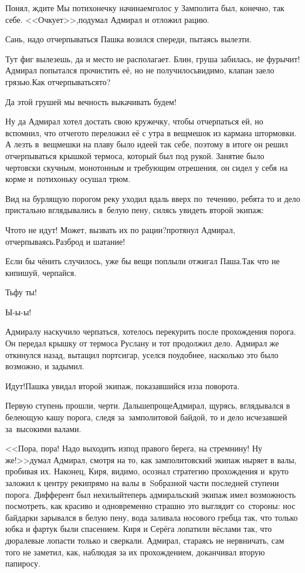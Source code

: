 \diagdash Понял, ждите\myldots{} Мы потихонечку начинаем\myldots{}\mdash голос у Замполита был, конечно, так себе. <<Очкует>>,\mdash подумал Адмирал и отложил рацию.

\diagdash Сань, надо отчерпываться\myldots{} \mdash Пашка возился спереди, пытаясь вылезти.

\diagdash Тут фиг вылезешь, да и место не располагает. Блин, груша забилась, не фурычит!\mdash Адмирал попытался прочистить её, но не получилось\mdash видимо, клапан заело грязью.\mdash Как отчерпываться\sdash то?

\diagdash Да этой грушей мы вечность выкачивать будем!

\diagdash Ну да\myldots{} \mdash Адмирал хотел достать свою кружечку, чтобы отчерпаться ей, но вспомнил, что отчего\sdash то переложил её с утра в вещмешок из кармана штормовки. А лезть в~вещмешки на плаву было идеей так себе, поэтому в итоге он решил отчерпываться крышкой термоса, который был под рукой. Занятие было чертовски скучным, монотонным и требующим отрешения, он сидел у себя на корме и~потихоньку осушал трюм.

Вид на бурлящую порогом реку уходил вдаль вверх по~течению, ребята то и дело пристально вглядывались в~белую пену, силясь увидеть второй экипаж:

\diagdash Что\sdash то не идут! Может, вызвать их по рации?\mdash протянул Адмирал, отчерпываясь.\mdash Разброд и шатание!

\diagdash Если бы чё\sdash нить случилось, уже бы вещи поплыли\myldots{} \mdash отжигал Паша.\mdash Так что не кипишуй, черпайся.

\diagdash Тьфу ты!

\diagdash Ы-ы-ы!

Адмиралу наскучило черпаться, хотелось перекурить после прохождения порога. Он передал крышку от термоса Руслану и тот продолжил дело. Адмирал же откинулся назад, вытащил портсигар, уселся поудобнее, насколько это было возможно, и задымил.

\diagdash Идут!\mdash Пашка увидал второй экипаж, показавшийся из\sdash за поворота. 

\diagdash Первую ступень прошли, черти. Дальше\mdash проще\myldots{}\mdash Адмирал, щурясь, вглядывался в белеющую кашу порога, следя за~замполитовой байдой, то и дело исчезавшей за~высокими валами.%

<<Пора, пора! Надо выходить из\sdash под правого берега, на стремнину! Ну же!>>\mdash думал Адмирал, смотря на то, как замполитовский экипаж ныряет в валы, пробивая их. Наконец, Киря, видимо, осознал стратегию прохождения и~круто заложил к центру реки\mdash прямо на валы в~S\sdash образной части последней ступени порога. Дифферент был нехилый\mdash теперь адмиральский экипаж имел возможность посмотреть, как красиво и одновременно страшно это выглядит со~стороны: нос байдарки зарывался в белую пену, вода заливала носового гребца так, что только юбка и фартук были спасением. Киря и Серёга лопатили вёслами так, что дюралевые лопасти только и сверкали. Адмирал, стараясь не нервничать, сам того не заметил, как, наблюдая за их прохождением, доканчивал вторую папиросу.

